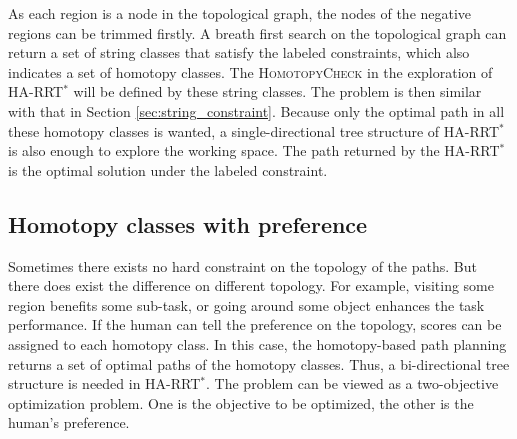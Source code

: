 \documentclass[letterpaper, 10 pt, conference]{ieeeconf}
\begin{document}
As each region is a node in the topological graph, the nodes of the negative regions can be trimmed firstly.
A breath first search on the topological graph can return a set of string classes that satisfy the labeled constraints, which also indicates a set of homotopy classes. 
The \textsc{HomotopyCheck} in the exploration of HA-RRT$^{*}$ will be defined by these string classes.
The problem is then similar with that in Section \ref{sec:string_constraint}.
Because only the optimal path in all these homotopy classes is wanted, a single-directional tree structure of HA-RRT$^{*}$ is also enough to explore the working space.
The path returned by the HA-RRT$^{*}$ is the optimal solution under the labeled constraint.

\subsection{Homotopy classes with preference}
\label{sec:with_preference}

Sometimes there exists no hard constraint on the topology of the paths.
But there does exist the difference on different topology.
For example, visiting some region benefits some sub-task, or going around some object enhances the task performance.
If the human can tell the preference on the topology, scores can be assigned to each homotopy class.
In this case, the homotopy-based path planning returns a set of optimal paths of the homotopy classes.
Thus, a bi-directional tree structure is needed in HA-RRT$^{*}$.
The problem can be viewed as a two-objective optimization problem.
One is the objective to be optimized, the other is the human's preference.
\end{document}
